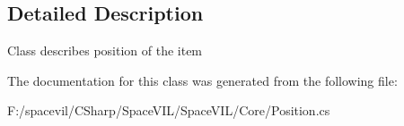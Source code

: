 \subsection{Detailed Description}
Class describes position of the item 



The documentation for this class was generated from the following file\+:\begin{DoxyCompactItemize}
\item 
F\+:/spacevil/\+C\+Sharp/\+Space\+V\+I\+L/\+Space\+V\+I\+L/\+Core/Position.\+cs\end{DoxyCompactItemize}
